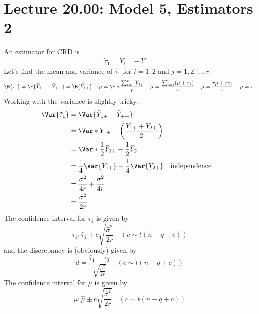 \section{Lecture 20.00: Model 5, Estimators 2}
An estimator for CRD is
\[ \tilde{\tau}_1=\bar{Y}_{1+}-\bar{Y}_{++} \]
Let's find the mean and variance of $ \tilde{\tau_1} $ for $ i=1,2 $ and
$ j=1,2,\ldots,r $.
\[ \E{\tilde{\tau}_1}
    =\E{\bar{Y}_{1+}-\bar{Y}_{++}}
    =\E{\bar{Y}_{1+}}-\mu
    =\E*{\frac{\sum_{i=1}^{r} Y_{1j}}{r}}-\mu
    =\frac{\sum_{i=1}^{r} (\mu+\tau_1)}{r} -\mu
    =\frac{r\mu+r\tau_1}{r} -\mu
    =\tau_1 \]
Working with the variance is slightly tricky.
\begin{align*}
    \Var{\tilde{\tau}_1}
     & =\Var{\bar{Y}_{1+}-\bar{Y}_{++}}                                                                 \\
     & =\Var*{\bar{Y}_{1+}-\biggl(\frac{\bar{Y}_{1+}+\bar{Y}_{2+}}{2} \biggr)}                          \\
     & =\Var*{\frac{1}{2} \bar{Y}_{1+}-\frac{1}{2} \bar{Y}_{2+}}                                        \\
     & =\frac{1}{4}\Var{\bar{Y}_{1+}}+\frac{1}{4} \Var{\bar{Y}_{2+}}           &  & \text{independence} \\
     & =\frac{\sigma^2}{4r}+\frac{\sigma^2}{4r}                                                         \\
     & =\frac{\sigma^2}{2r}
\end{align*}
The confidence interval for $ \tau_1 $ is given by
\[ \tau_1:\hat{\tau}_1\pm c\sqrt{\frac{\hat{\sigma}^2}{2r}}\quad(c\sim t(n-q+c)) \]
and the discrepancy is (obviously) given by
\[ d=\frac{\hat{\tau}_1-\tau_0}{\displaystyle \sqrt{\frac{\hat{\sigma}^2}{2r}}}\quad(c\sim t(n-q+c))  \]
The confidence interval for $ \mu $ is given by
\[ \mu:\hat{\mu}\pm c\sqrt{\frac{\hat{\sigma}^2}{2r}}\quad(c\sim t(n-q+c)) \]
